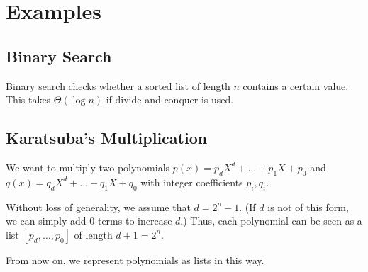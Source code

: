 %
%
%
%

\section{Examples}

\subsection{Binary Search}

Binary search checks whether a sorted list of length $n$ contains a certain value.
This takes $\Theta(\log n)$ if divide-and-conquer is used.

\subsection{Karatsuba's Multiplication}

We want to multiply two polynomials $p(x)=p_dX^d+\ldots+p_1X+p_0$ and $q(x)=q_dX^d+\ldots+q_1X+q_0$ with integer coefficients $p_i,q_i$.

Without loss of generality, we assume that $d=2^n-1$.
(If $d$ is not of this form, we can simply add $0$-terms to increase $d$.)
Thus, each polynomial can be seen as a list $[p_d,\ldots,p_0]$ of length $d+1=2^n$.

From now on, we represent polynomials as lists in this way.

